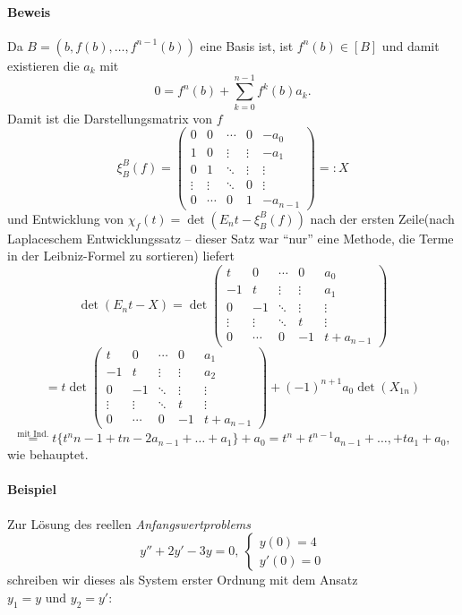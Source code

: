 \paragraph{Beweis}
	Da $ B= \left(b,f(b),\dots,f^{n-1}(b)\right) $ eine Basis ist, ist $ f^n(b)\in [B] $ und damit existieren die $ a_k $ mit
		\[ 0 = f^n(b) + \sum_{k=0}^{n-1}f^k(b)a_k. \]
	Damit ist die Darstellungsmatrix von $ f $
		\[ \xi_B^B(f) =
		\begin{pmatrix}
		0 & 0 & \cdots & 0 & -a_0 \\ 
		1 & 0 & \vdots & \vdots & -a_1 \\ 
		0 & 1 & \ddots & \vdots & \vdots \\ 
		\vdots & \vdots & \ddots & 0 & \vdots \\ 
		0 & \cdots & 0 & 1 & -a_{n-1}
		\end{pmatrix} =: X\]
	und Entwicklung von $ \chi_f(t)=\det(E_nt-\xi_B^B(f)) $ nach der ersten Zeile(nach Laplaceschem Entwicklungssatz -- dieser Satz war "`nur"' eine Methode, die Terme in der Leibniz-Formel zu sortieren) liefert
		\[ \det(E_nt-X) = \det 
		\begin{pmatrix}
		t & 0 & \cdots & 0 & a_0 \\ 
		-1 & t & \vdots & \vdots & a_1 \\ 
		0 & -1 & \ddots & \vdots & \vdots \\ 
		\vdots & \vdots & \ddots & t & \vdots \\ 
		0 & \cdots & 0 & -1 & t+a_{n-1}
		\end{pmatrix} \]
		\[ = t \det \begin{pmatrix}
		t & 0 & \cdots & 0 & a_1 \\ 
		-1 & t & \vdots & \vdots & a_2 \\ 
		0 & -1 & \ddots & \vdots & \vdots \\ 
		\vdots & \vdots & \ddots & t & \vdots \\ 
		0 & \cdots & 0 & -1 & t+a_{n-1}
		\end{pmatrix} + (-1)^{n+1} a_0 \det(X_{1n}) \]
		\[ \overset{\text{mit Ind.}}{=} t \{t^n{n-1}+t{n-2}a_{n-1}+\dots+a_1\}+a_0 = t^n+t^{n-1}a_{n-1}+\dots,+ta_1+a_0, \]
	wie behauptet.
\paragraph{Beispiel}
	Zur Lösung des reellen \emph{Anfangswertproblems}
		\[ y'' + 2y' - 3y = 0,\ 
		\begin{cases}
			y(0)=4 \\
			y'(0)=0
		\end{cases} \]
	schreiben wir dieses als System erster Ordnung mit dem Ansatz $ y_1 = y \text{ und }y_2 = y' $:
	
